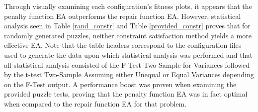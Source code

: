 \documentclass[11pt]{article}
\begin{document}
Through visually examining each configuration's fitness plots, it appears that the penalty function EA 
outperforms the repair function EA. However, statistical analysis seen in Table \ref{rand_constr} and Table \ref{provided_constr}
proves that for randomly generated puzzles, neither constraint satisfaction method yields a more effective EA. Note that the table
headers correspond to the configuration files used to generate the data upon which statistical analysis was performed and that
all statistical analysis consisted of the F-Test Two-Sample for Variances followed by the t-test Two-Sample Assuming either Unequal or
Equal Variances depending on the F-Test output.
A performance boost was proven when examining the provided puzzle tests, proving that the penalty function EA was in fact
optimal when compared to the repair function EA for that problem. 
\end{document}
